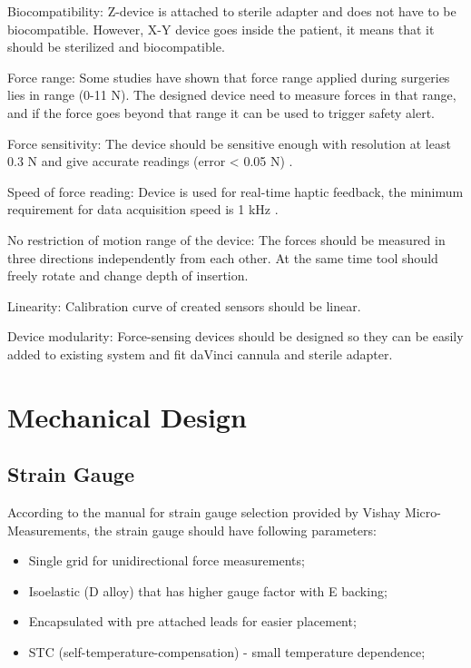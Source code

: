 	Biocompatibility: Z-device is attached to sterile adapter and does not have to be biocompatible. However, X-Y device goes inside the patient, it means that it should be sterilized and biocompatible.
	
	Force range: Some studies \cite{mack_interactive_2012, prasad_modular_2003, } have shown that force range applied during surgeries lies in range (0-11 N). The designed device need to measure forces in that range, and if the force goes beyond that range it can be used to trigger safety alert.
	
	Force sensitivity: The device should be sensitive enough with resolution at least 0.3 N and give accurate readings (error < 0.05 N) \cite{mack_interactive_2012}.
	
	Speed of force reading: Device is used for real-time haptic feedback, the minimum requirement for data acquisition speed is 1 kHz \cite{seungmoon_choi_effect_2004}.
	
	No restriction of motion range of the device: The forces should be measured  in three directions independently from each other. At the same time tool should freely rotate and change depth of insertion.	
	
	Linearity: Calibration curve of created sensors should be linear.

	Device modularity: Force-sensing devices should be designed so they can be easily added to existing system and fit daVinci cannula and sterile adapter.
	
\section{Mechanical Design}
\label{sec:mechDes}

	\subsection{Strain Gauge}
	\label{sec:SGReq}
	According to the manual for strain gauge selection provided by Vishay Micro-Measurements, the strain gauge should have following parameters:
\begin{itemize}
  \item Single grid for unidirectional force measurements;
  \item Isoelastic (D alloy) that has higher gauge factor with E backing;
  \item Encapsulated with pre attached leads for easier placement;
  \item STC (self-temperature-compensation) - small temperature dependence;
\end{itemize}	
	
